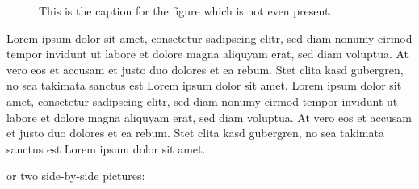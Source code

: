 \begin{figure}[!ht]
\centering
{}
\caption{This is the caption for the figure which is not even present.}
\label{fig:PictMis}
\end{figure}


Lorem ipsum dolor sit amet, consetetur sadipscing elitr, sed diam nonumy eirmod tempor invidunt ut labore et dolore magna aliquyam erat, sed diam voluptua. At vero eos et accusam et justo duo dolores et ea rebum. Stet clita kasd gubergren, no sea takimata sanctus est Lorem ipsum dolor sit amet. Lorem ipsum dolor sit amet, consetetur sadipscing elitr, sed diam nonumy eirmod tempor invidunt ut labore et dolore magna aliquyam erat, sed diam voluptua. At vero eos et accusam et justo duo dolores et ea rebum. Stet clita kasd gubergren, no sea takimata sanctus est Lorem ipsum dolor sit amet.

or two side-by-side pictures:

